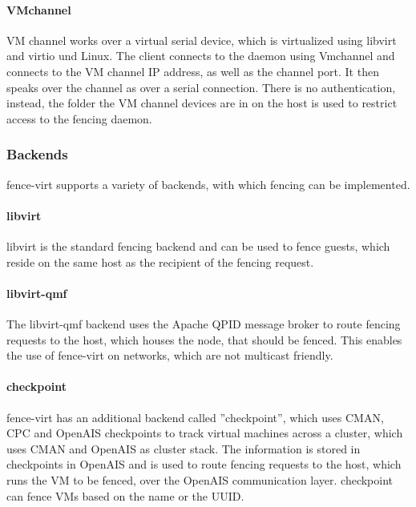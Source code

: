 \paragraph{VMchannel}
VM channel works over a virtual serial device, which is virtualized using libvirt and
virtio und Linux.
The client connects to the daemon using Vmchannel and connects to the VM channel IP address,
as well as the channel port. It then speaks over the channel as over a serial connection.
There is no authentication, instead, the folder the VM channel devices are in on the host
is used to restrict access to the fencing daemon.

\subsubsection{Backends}
fence-virt supports a variety of backends, with which fencing can be implemented.
\paragraph{libvirt}
libvirt is the standard fencing backend and can be used to fence guests, which
reside on the same host as the recipient of the fencing request.
\paragraph{libvirt-qmf}
The libvirt-qmf backend uses the Apache QPID message broker to route fencing
requests to the host, which houses the node, that should be fenced. This
enables the use of fence-virt on networks, which are not multicast friendly.
\paragraph{checkpoint}
fence-virt has an additional backend called ''checkpoint'', which uses
CMAN, CPC and OpenAIS checkpoints to track virtual machines across a cluster, which
uses CMAN and OpenAIS as cluster stack. The information is stored in checkpoints
in OpenAIS and is used to route fencing requests to the host, which runs the \ac{VM}
to be fenced, over the OpenAIS communication layer.
checkpoint can fence \acp{VM} based on the name or the UUID.

